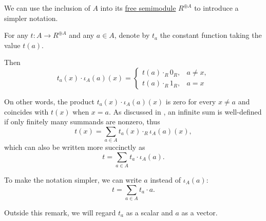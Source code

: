 \begin{remark}\label{rem:free_semimodule_notation}
  We can use the inclusion  of \( A \) into its \hyperref[def:free_semimodule]{free semimodule} \( R^{\oplus A} \) to introduce a simpler notation.

  For any \( t: A \to R^{\oplus A} \) and any \( a \in A \), denote by \( t_a \) the constant function taking the value \( t(a) \).

  Then
  \begin{equation*}
    t_a(x) \cdot \iota_A(a)(x)
    =
    \begin{cases}
      t(a) \cdot_R 0_R, &a \neq x, \\
      t(a) \cdot_R 1_R, &a = x
    \end{cases}
  \end{equation*}

  On other words, the product \( t_a(x) \cdot \iota_A(a)(x) \) is zero for every \( x \neq a \) and coincides with \( t(x) \) when \( x = a \). As discussed in , an infinite sum is well-defined if only finitely many summands are nonzero, thus
  \begin{equation*}
    t(x) = \sum_{a \in A} t_a(x) \cdot_R \iota_A(a)(x),
  \end{equation*}
  which can also be written more succinctly as
  \begin{equation*}
    t = \sum_{a \in A} t_a \cdot \iota_A(a).
  \end{equation*}

  To make the notation simpler, we can write \( a \) instead of \( \iota_A(a) \):
  \begin{equation}\label{eq:def:free_semimodule/sum}
    t = \sum_{a \in A} t_a \cdot a.
  \end{equation}

  Outside this remark, we will regard \( t_a \) as a scalar and \( a \) as a vector.
\end{remark}

